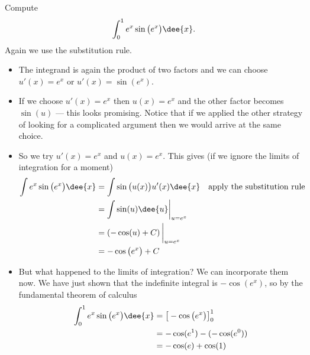\begin{eg}\label{eg:substitution1}
Compute
\begin{align*}
  \int_0^1 e^x\sin\big(e^x\big)\dee{x}.
\end{align*}
\soln Again we use the substitution rule.
\begin{itemize}
 \item The integrand is again the product of two factors and we can choose $u'(x)=e^x$ or
$u'(x)=\sin(e^x)$.
\item If we choose $u'(x)=e^x$ then $u(x)=e^x$ and the other factor becomes $\sin(u)$ ---
this looks promising. Notice that if we applied the other strategy of looking for a
complicated argument then we would arrive at the same choice.

\item So we try $u'(x)=e^x$ and $u(x)=e^x$. This gives (if we ignore the limits of
integration for a moment)
\begin{align*}
  \int e^x \sin\big(e^x\big)\dee{x}
&= \int \sin\big(u(x)\big) u'(x) \dee{x} &\text{apply the substitution rule}\\
&= \int \sin(u)\dee{u} \bigg|_{u=e^x}\\
&= \left(-\cos(u)+C \right)\bigg|_{u=e^x}\\
&= -\cos\big(e^x\big) +C
\end{align*}
\item But what happened to the limits of integration? We can incorporate them now. We
have just shown that the indefinite integral is $-\cos(e^x)$, so by the fundamental
theorem of calculus
\begin{align*}
  \int_0^1 e^x\sin\big(e^x\big)\dee{x}
  &= \big[-\cos\big(e^x\big)\big]_0^1\\
  &= -\cos(e^1)-(-\cos(e^0)) \\
  &= -\cos(e)+\cos(1)
\end{align*}
\end{itemize}
\end{eg}
